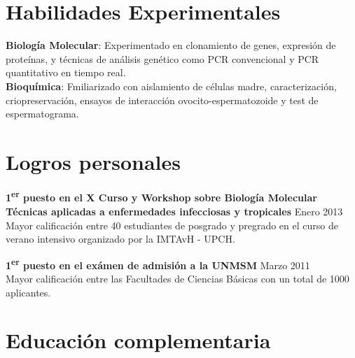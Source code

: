 \documentclass[margin,line]{res}
\newenvironment{list2}{
	\begin{list}{$\bullet$}{%
			\setlength{\itemsep}{0in}
			\setlength{\parsep}{0in} \setlength{\parskip}{0in}
			\setlength{\topsep}{0in} \setlength{\partopsep}{0in}
			\setlength{\leftmargin}{0.2in}}}{\end{list}}
\begin{document}
\begin{resume}
		
		\section{\sc Habilidades Experimentales}
		{\bf Biología Molecular}: Experimentado en clonamiento de genes, expresión de proteínas, y técnicas de análisis genético como PCR convencional y PCR quantitativo en tiempo real.\\
		{\bf Bioquímica}: Fmiliarizado con aislamiento de células madre, caracterización, criopreservación, ensayos de interacción ovocito-espermatozoide y test de espermatograma.\\ %
		
		\newpage
		
		\section{\sc Logros personales}
		
		{\bf 1\textsuperscript{er} puesto en el X Curso y Workshop sobre Biología Molecular \\Técnicas aplicadas a enfermedades infecciosas y tropicales} \hfill Enero 2013\\
		Mayor calificación entre 40 estudiantes de posgrado y pregrado en el curso de verano intensivo organizado por la IMTAvH - UPCH.
		
		{\bf 1\textsuperscript{er} puesto en el exámen de admisión a la UNMSM} \hfill Marzo 2011\\
		Mayor calificación entre las Facultades de Ciencias Básicas con un total de 1000 aplicantes.\\
		
		\section{\sc Educación complementaria}
		

\end{resume}
\end{document}
